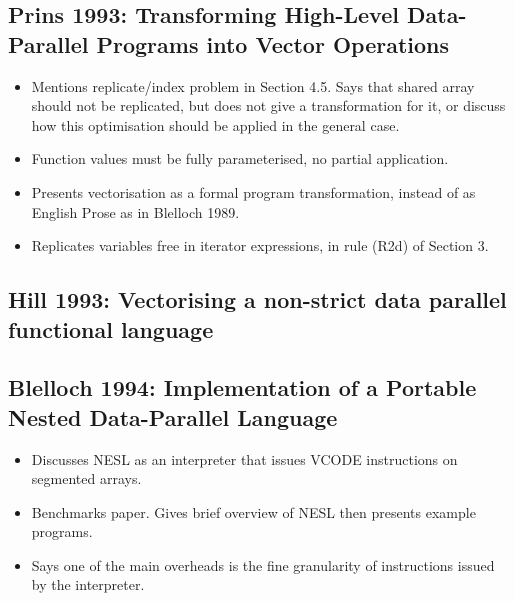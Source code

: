 \subsection{
        \cite{Prins:transformation-vector-operations}
        Prins 1993: Transforming High-Level Data-Parallel Programs into Vector Operations }

\begin{itemize}
\item	Mentions replicate/index problem in Section 4.5. Says that shared array should not be replicated, but does not give a transformation for it, or discuss how this optimisation should be applied in the general case. 
\item	Function values must be fully parameterised, no partial application.
\item	Presents vectorisation as a formal program transformation, instead of as English Prose as in Blelloch 1989.
\item	Replicates variables free in iterator expressions, in rule (R2d) of Section 3.
\end{itemize}


\subsection{Hill 1993: Vectorising a non-strict data parallel functional language}


\subsection{
        \cite{Blelloch:implementation-portable}
        Blelloch 1994: Implementation of a Portable Nested Data-Parallel Language}
\begin{itemize}
\item 	Discusses NESL as an interpreter that issues VCODE instructions on segmented arrays.
\item 	Benchmarks paper. Gives brief overview of NESL then presents example programs.
\item 	Says one of the main overheads is the fine granularity of instructions issued by the interpreter.
\end{itemize}

